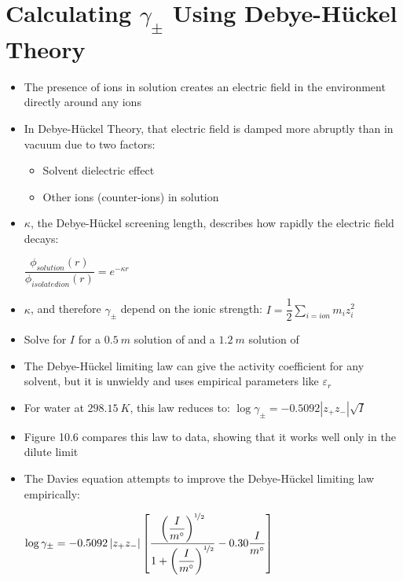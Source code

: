 \documentclass[12pt, openany, letterpaper]{memoir}
\begin{document}
\section*{Calculating $\gamma_\pm$ Using Debye-H\"uckel Theory}
\begin{itemize}
	\item The presence of ions in solution creates an electric field in the environment directly around any ions
	\item In Debye-H\"uckel Theory, that electric field is damped more abruptly than in vacuum due to two factors:
	\begin{itemize}
		\item Solvent dielectric effect
		\item Other ions (counter-ions) in solution
	\end{itemize}
	\item $\kappa$, the Debye-H\"uckel screening length, describes how rapidly the electric field decays: 
	
	$\dfrac{\phi_{solution}(r)}{\phi_{isolated ion}(r)}=e^{-\kappa r}$
	\item $\kappa$, and therefore $\gamma_\pm$ depend on the ionic strength: $I = \dfrac{1}{2}\sum\limits_{i=ion}m_iz_i^2$
	\item Solve for $I$ for a $0.5~m$ solution of  and a $1.2~m$ solution of 
	\item The Debye-H\"uckel limiting law can give the activity coefficient for any solvent, but it is unwieldy and uses empirical parameters like $\varepsilon_r$
	\item For water at $298.15~K$, this law reduces to: $\log\gamma_\pm = -0.5092\left|z_+z_-\right|\sqrt{I}$
	\item Figure 10.6 compares this law to data, showing that it works well only in the dilute limit
	\item The Davies equation attempts to improve the Debye-H\"uckel limiting law empirically:
	
	$\log\gamma_\pm = -0.5092\left|z_+z_-\right|\left[\dfrac{\left(\dfrac{I}{m^\circ}\right)^{\nicefrac{1}{2}}}{1+\left(\dfrac{I}{m^\circ}\right)^{\nicefrac{1}{2}}}-0.30\dfrac{I}{m^\circ}\right]$
\end{itemize}
\end{document}
